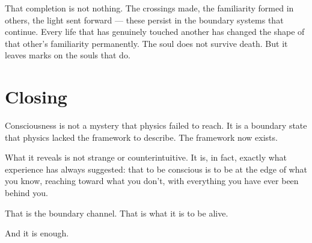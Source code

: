 \documentclass[12pt]{article}
\begin{document}
That completion is not nothing. The crossings made, the familiarity formed in
others, the light sent forward --- these persist in the boundary systems that
continue. Every life that has genuinely touched another has changed the shape of
that other's familiarity permanently. The soul does not survive death. But it
leaves marks on the souls that do.

\section{Closing}

Consciousness is not a mystery that physics failed to reach. It is a boundary
state that physics lacked the framework to describe. The framework now exists.

What it reveals is not strange or counterintuitive. It is, in fact, exactly what
experience has always suggested: that to be conscious is to be at the edge of
what you know, reaching toward what you don't, with everything you have ever been
behind you.

That is the boundary channel. That is what it is to be alive.

And it is enough.
\end{document}

